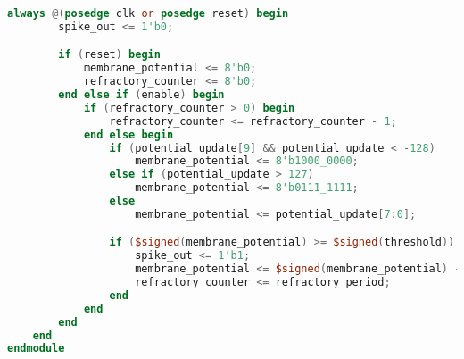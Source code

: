 \begin{table*}[!htbp]
\begin{minipage}[t]{.49\textwidth}
\begin{lstlisting}[language=Verilog, caption={Final Module}]
    always @(posedge clk or posedge reset) begin
        spike_out <= 1'b0;

        if (reset) begin
            membrane_potential <= 8'b0;
            refractory_counter <= 8'b0;
        end else if (enable) begin
            if (refractory_counter > 0) begin
                refractory_counter <= refractory_counter - 1;
            end else begin
                if (potential_update[9] && potential_update < -128)
                    membrane_potential <= 8'b1000_0000;
                else if (potential_update > 127)
                    membrane_potential <= 8'b0111_1111;
                else
                    membrane_potential <= potential_update[7:0];

                if ($signed(membrane_potential) >= $signed(threshold)) begin
                    spike_out <= 1'b1;
                    membrane_potential <= $signed(membrane_potential) - $signed(threshold);
                    refractory_counter <= refractory_period;
                end
            end
        end
    end
endmodule
\end{lstlisting}
\end{minipage}

\end{table*}



